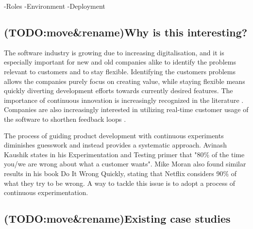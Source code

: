 \documentclass[english]{tktltiki2}
\theoremstyle{definition}
\theoremstyle{remark}
\begin{document}
-Roles
-Environment
-Deployment

\subsection{(TODO:move\&rename)Why is this interesting?}

The software industry is growing due to increasing digitalisation, and it is especially important for new and old companies alike to identify the problems relevant to customers and to stay flexible. Identifying the customers problems allows the companies purely focus on creating value, while staying flexible means quickly diverting development efforts towards currently desired features. The importance of continuous innovation is increasingly recognized in the literature \cite{steiber2013corporate}. Companies are also increasingly interested in utilizing real-time customer usage of the software to shorthen feedback loops \cite{olsson2012climbing}. 

The process of guiding product development with continuous experiments diminishes guesswork and instead provides a systematic approach. Avinash Kaushik states in his Experimentation and Testing primer \cite{kaushik} that "80\% of the time you/we are wrong about what a customer wants". Mike Moran also found similar results in his book Do It Wrong Quickly, stating that Netflix considers 90\% of what they try to be wrong. A way to tackle this issue is to adopt a process of continuous experimentation.




\subsection{(TODO:move\&rename)Existing case studies}
\end{document}
